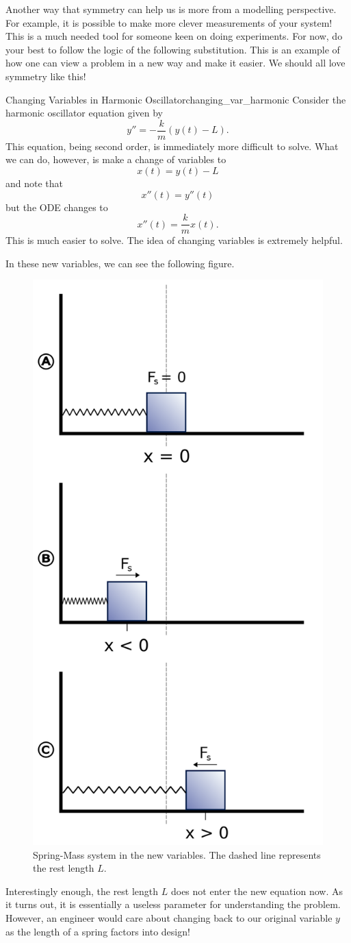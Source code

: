         
        Another way that symmetry can help us is more from a modelling perspective. For example, it is possible to make more clever measurements of your system! This is a much needed tool for someone keen on doing experiments. For now, do your best to follow the logic of the following substitution.  This is an example of how one can view a problem in a new way and make it easier.  We should all love symmetry like this! 
        
        \begin{ex}{Changing Variables in Harmonic Oscillator}{changing_var_harmonic}
        Consider the harmonic oscillator equation given by
        \[
        y'' = -\frac{k}{m}(y(t)-L).
        \]
        This equation, being second order, is immediately more difficult to solve.  What we can do, however, is make a change of variables to
        \[
        x(t)=y(t)-L
        \]
        and note that
        \[
        x''(t)=y''(t)
        \]
        but the ODE changes to
        \[
        x''(t)=\frac{k}{m}x(t).
        \]
        This is much easier to solve.  The idea of changing variables is extremely helpful.
        
        In these new variables, we can see the following figure.
        \begin{figure}[H]
            \centering
            \includegraphics[width=.3\textwidth]{Figures/spring-mass.png}
            \caption{Spring-Mass system in the new variables. The dashed line represents the rest length $L$.}
            \label{fig:spring_mass}
        \end{figure}
        Interestingly enough, the rest length $L$ does not enter the new equation now. As it turns out, it is essentially a useless parameter for understanding the problem.  However, an engineer would care about changing back to our original variable $y$ as the length of a spring factors into design!
        

\end{ex}
